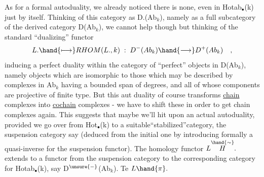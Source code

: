 As for a formal autoduality,
we already noticed there is none, even in Hotab$_{\bullet}$(k) just by itself.
Thinking of this category as D.(Ab$_{k}$), namely as a full subcategory of
the derived category D(Ab$_{k}$), we cannot help though but thinking of
the standard ``dualizing'' functor
\[ L. \hand{\longmapsto} RHOM(L.,k) \;:\; D^{-}(Ab_{k}) \hand{\longrightarrow} D^{+}(Ab_{k}) \quad , \]
inducing a perfect duality  within the category of ``perfect''
objects in D(Ab$_{k}$), namely objects which are isomorphic to those which
may be described by complexes in Ab$_{k}$ having a bounded span of degrees,
and all of whose components are projective of finite type. But this aut%
duality of course transforms \uline{chain} complexes into \uline{cochain} complexes
- we have to shift these in order to get chain complexes again. This
suggests that maybe we'll hit upon  an actual autoduality,
provided we go over from Hot$_{\bullet}$(k) to a suitable``stabilized''category,
the suspension category say (deduced from the initial one by 
introducing formally a quasi-inverse for the suspension functor). The
homology functor $L\overset{\hand{\sim}}{H}.$ extends to a functor from the suspension category
to the corresponding category for Hotab$_{\bullet}$(k), say D$^{\unsure{-}}$(Ab$_{k}$). Te $L\hand{\pi}.$


